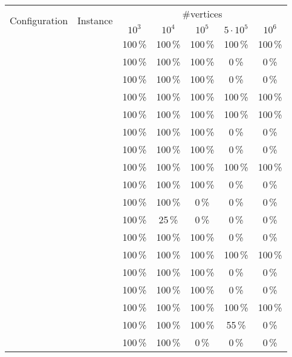 \begin{table}
	\centering
	\small
	\begin{tabular}{|l|l|ccccc|}
		\hline
		\multirow{2}{*}{Configuration} & \multirow{2}{*}{Instance} & \multicolumn{5}{|c|}{\#vertices} \\
		& & $10^3$ & $10^4$ & $10^5$ & $5 \cdot 10^5$ & $10^6$ \\
		\hline
		\hline
		\multirow{4}{*}{\vdefault}
			& \walk           & 100\,\% & 100\,\% & 100\,\% & 100\,\% & 100\,\% \\
			& \sinewalk       & 100\,\% & 100\,\% & 100\,\% &   0\,\% &   0\,\% \\
			& \parabolawalk   & 100\,\% & 100\,\% & 100\,\% &   0\,\% &   0\,\% \\
			& \concavevalleys & 100\,\% & 100\,\% & 100\,\% & 100\,\% & 100\,\% \\
		\hline
		\multirow{4}{*}{\vnodom}
			& \walk           & 100\,\% & 100\,\% & 100\,\% & 100\,\% & 100\,\% \\
			& \sinewalk       & 100\,\% & 100\,\% & 100\,\% &   0\,\% &   0\,\% \\
			& \parabolawalk   & 100\,\% & 100\,\% & 100\,\% &   0\,\% &   0\,\% \\
			& \concavevalleys & 100\,\% & 100\,\% & 100\,\% & 100\,\% & 100\,\% \\
		\hline
		\multirow{4}{*}{\vnow}
			& \walk           & 100\,\% & 100\,\% & 100\,\% &   0\,\% &   0\,\% \\
			& \sinewalk       & 100\,\% & 100\,\% &   0\,\% &   0\,\% &   0\,\% \\
			& \parabolawalk   & 100\,\% &  25\,\% &   0\,\% &   0\,\% &   0\,\% \\
			& \concavevalleys & 100\,\% & 100\,\% & 100\,\% &   0\,\% &   0\,\% \\
		\hline
		\hline
		\multirow{4}{*}{\pdefault}
			& \walk           & 100\,\% & 100\,\% & 100\,\% & 100\,\% & 100\,\% \\
			& \sinewalk       & 100\,\% & 100\,\% & 100\,\% &   0\,\% &   0\,\% \\
			& \parabolawalk   & 100\,\% & 100\,\% & 100\,\% &   0\,\% &   0\,\% \\
			& \concavevalleys & 100\,\% & 100\,\% & 100\,\% & 100\,\% & 100\,\% \\
		\hline
		\multirow{4}{*}{\pnoedge}
			& \walk           & 100\,\% & 100\,\% & 100\,\% &  55\,\% &   0\,\% \\
			& \sinewalk       & 100\,\% & 100\,\% &   0\,\% &   0\,\% &   0\,\% \\

\end{tabular}
\end{table}
